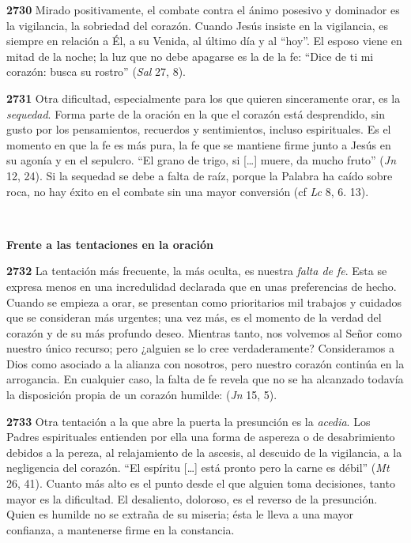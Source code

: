 \documentclass[]{article}
\begin{document}
\textbf{2730} Mirado positivamente, el combate contra el ánimo posesivo y dominador es la vigilancia, la sobriedad del corazón. Cuando Jesús insiste en la vigilancia, es siempre en relación a Él, a su Venida, al último día y al ``hoy''. El esposo viene en mitad de la noche; la luz que no debe apagarse es la de la fe: ``Dice de ti mi corazón: busca su rostro'' (\emph{Sal} 27, 8).

\textbf{2731} Otra dificultad, especialmente para los que quieren sinceramente orar, es la \emph{sequedad}. Forma parte de la oración en la que el corazón está desprendido, sin gusto por los pensamientos, recuerdos y sentimientos, incluso espirituales. Es el momento en que la fe es más pura, la fe que se mantiene firme junto a Jesús en su agonía y en el sepulcro. ``El grano de trigo, si [\ldots{}] muere, da mucho fruto'' (\emph{Jn} 12, 24). Si la sequedad se debe a falta de raíz, porque la Palabra ha caído sobre roca, no hay éxito en el combate sin una mayor conversión (cf \emph{Lc} 8, 6. 13).

\textbf{\\ }

\textbf{Frente a las tentaciones en la oración}

\textbf{2732} La tentación más frecuente, la más oculta, es nuestra \emph{falta de fe}. Esta se expresa menos en una incredulidad declarada que en unas preferencias de hecho. Cuando se empieza a orar, se presentan como prioritarios mil trabajos y cuidados que se consideran más urgentes; una vez más, es el momento de la verdad del corazón y de su más profundo deseo. Mientras tanto, nos volvemos al Señor como nuestro único recurso; pero ¿alguien se lo cree verdaderamente? Consideramos a Dios como asociado a la alianza con nosotros, pero nuestro corazón continúa en la arrogancia. En cualquier caso, la falta de fe revela que no se ha alcanzado todavía la disposición propia de un corazón humilde:  (\emph{Jn} 15, 5).

\textbf{2733} Otra tentación a la que abre la puerta la presunción es la \emph{acedia}. Los Padres espirituales entienden por ella una forma de aspereza o de desabrimiento debidos a la pereza, al relajamiento de la ascesis, al descuido de la vigilancia, a la negligencia del corazón. ``El espíritu [\ldots{}] está pronto pero la carne es débil'' (\emph{Mt} 26, 41). Cuanto más alto es el punto desde el que alguien toma decisiones, tanto mayor es la dificultad. El desaliento, doloroso, es el reverso de la presunción. Quien es humilde no se extraña de su miseria; ésta le lleva a una mayor confianza, a mantenerse firme en la constancia.
\end{document}
